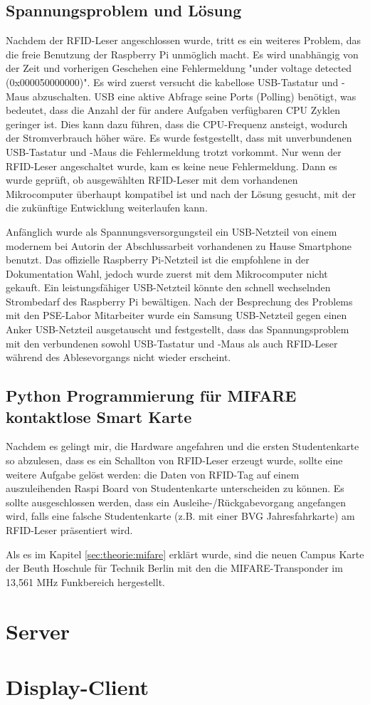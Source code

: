 \subsection{Spannungsproblem und Lösung}
\label{sec:register_client:voltage_issue}
Nachdem der RFID-Leser angeschlossen wurde, tritt es ein weiteres Problem, das die freie Benutzung der Raspberry Pi unmöglich macht. Es wird unabhängig von der Zeit und vorherigen Geschehen eine Fehlermeldung "under voltage detected (0x000050000000)". Es wird zuerst versucht die kabellose USB-Tastatur und -Maus abzuschalten. USB eine aktive Abfrage seine Ports (Polling) benötigt, was bedeutet, dass die Anzahl der für andere Aufgaben verfügbaren CPU Zyklen geringer ist. Dies kann dazu führen, dass die CPU-Frequenz ansteigt, wodurch der Stromverbrauch höher wäre. Es wurde festgestellt, dass mit unverbundenen USB-Tastatur und -Maus die Fehlermeldung trotzt vorkommt. Nur wenn der RFID-Leser angeschaltet wurde, kam es keine neue Fehlermeldung. Dann es wurde geprüft, ob ausgewählten RFID-Leser mit dem vorhandenen Mikrocomputer überhaupt kompatibel ist und nach der Lösung gesucht, mit der die zukünftige Entwicklung weiterlaufen kann.    

Anfänglich wurde als Spannungsversorgungsteil ein USB-Netzteil von einem modernem bei Autorin der Abschlussarbeit vorhandenen zu Hause Smartphone benutzt. Das offizielle Raspberry Pi-Netzteil ist die empfohlene in der Dokumentation Wahl, jedoch wurde zuerst mit dem Mikrocomputer nicht gekauft. Ein leistungsfähiger USB-Netzteil könnte den schnell wechselnden Strombedarf des Raspberry Pi bewältigen. Nach der Besprechung des Problems mit den PSE-Labor Mitarbeiter wurde ein Samsung USB-Netzteil gegen einen Anker USB-Netzteil ausgetauscht und festgestellt, dass das Spannungsproblem mit den verbundenen sowohl USB-Tastatur und -Maus als auch RFID-Leser während des Ablesevorgangs nicht wieder erscheint. 

\subsection{Python Programmierung für MIFARE kontaktlose Smart Karte   }
\label{sec:register_client:smart}
Nachdem es gelingt mir, die Hardware angefahren und die ersten Studentenkarte so abzulesen, dass es ein Schallton von RFID-Leser erzeugt wurde, sollte eine weitere Aufgabe gelöst werden: die Daten von RFID-Tag auf einem auszuleihenden Raspi Board von Studentenkarte unterscheiden zu können. Es sollte ausgeschlossen werden, dass ein Ausleihe-/Rückgabevorgang angefangen wird, falls eine falsche Studentenkarte (z.B. mit einer BVG Jahresfahrkarte) am RFID-Leser präsentiert wird. 

Als es im Kapitel \ref{sec:theorie:mifare} erklärt wurde, sind die neuen Campus Karte der Beuth Hoschule für Technik Berlin mit den die MIFARE-Transponder im 13,561 MHz Funkbereich hergestellt. 

\section{Server}
\label{sec:server}



\section{Display-Client}
\label{sec:display_client}
